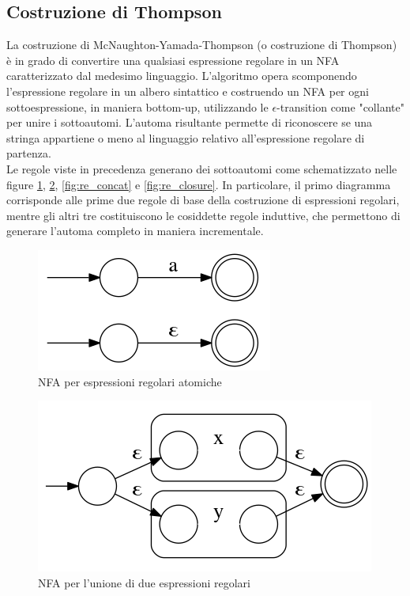 \subsection{Costruzione di Thompson}
La costruzione di McNaughton-Yamada-Thompson (o costruzione di Thompson) è in grado di convertire una qualsiasi espressione regolare in un NFA caratterizzato dal medesimo linguaggio. L'algoritmo opera scomponendo l'espressione regolare in un albero sintattico e costruendo un NFA per ogni sottoespressione, in maniera bottom-up, utilizzando le $\epsilon$-transition come "collante" per unire i sottoautomi. L'automa risultante permette di riconoscere se una stringa appartiene o meno al linguaggio relativo all'espressione regolare di partenza.\\
Le regole viste in precedenza generano dei sottoautomi come schematizzato nelle figure \ref{fig:re_atom}, \ref{fig:re_union}, \ref{fig:re_concat} e \ref{fig:re_closure}. In particolare, il primo diagramma corrisponde alle prime due regole di base della costruzione di espressioni regolari, mentre gli altri tre costituiscono le cosiddette regole induttive, che permettono di generare l'automa completo in maniera incrementale.

\begin{figure}[htbp]
\centering
\includegraphics[scale=0.4]{./Img/automi/re_atom.png}
\caption{NFA per espressioni regolari atomiche}
\label{fig:re_atom}
\end{figure}


\begin{figure}[htbp]
\centering
\includegraphics[scale=0.4]{./Img/automi/re_union.png}
\caption{NFA per l'unione di due espressioni regolari}
\label{fig:re_union}
\end{figure}

